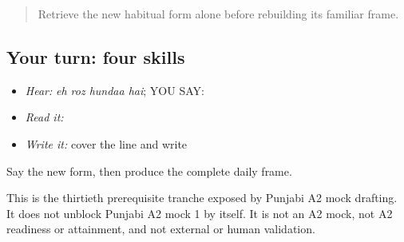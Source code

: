 \label{lesson:PA-C207-payoff}



\begin{quote}
Retrieve the new habitual form alone before rebuilding its familiar frame.
\end{quote}

\subsection*{Your turn: four skills}
\begin{itemize}
\raggedright
  \item \emph{Hear:} \emph{eh roz hundaa hai}; YOU SAY: \textbf{   }
  \item \emph{Read it:} \textbf{   }
  \item \emph{Write it:} cover the line and write \textbf{   }
\end{itemize}

\begin{tcolorbox}[breakable,colback=teal!4,colframe=teal!35!black,title={Before you move on}]
Say the new form, then produce the complete daily frame.

This is the thirtieth prerequisite tranche exposed by Punjabi A2 mock drafting. It does not unblock Punjabi A2 mock 1 by itself. It is not an A2 mock, not A2 readiness or attainment, and not external or human validation.
\end{tcolorbox}
